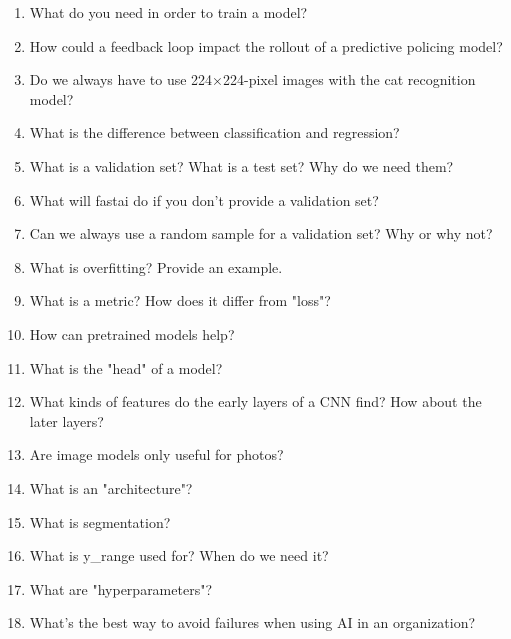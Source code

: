 \documentclass[12pt,a4paper]{article}
\begin{document}
\begin{enumerate}
\newpage

\item What do you need in order to train a model? \\

\item How could a feedback loop impact the rollout of a predictive policing model? \\

\item Do we always have to use 224×224-pixel images with the cat recognition model? \\

\item What is the difference between classification and regression? \\

\item What is a validation set? What is a test set? Why do we need them? \\

\item What will fastai do if you don't provide a validation set? \\

\item Can we always use a random sample for a validation set? Why or why not? \\

\item What is overfitting? Provide an example. \\

\item What is a metric? How does it differ from "loss"? \\

\item How can pretrained models help? \\

\item What is the "head" of a model? \\

\item What kinds of features do the early layers of a CNN find? How about the later layers? \\

\item Are image models only useful for photos? \\

\item What is an "architecture"? \\

\item What is segmentation? \\

\item What is y\_range used for? When do we need it? \\

\item What are "hyperparameters"? \\

\item What's the best way to avoid failures when using AI in an organization?

\end{enumerate}
\end{document}
